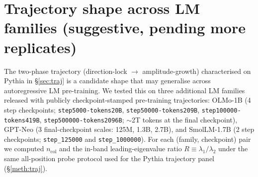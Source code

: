 \documentclass[11pt,a4paper]{article}
\begin{document}
\section{Trajectory shape across LM families (suggestive,
pending more replicates)}
\label{si:S15}

The two-phase trajectory (direction-lock $\to$ amplitude-growth)
characterised on Pythia in \S\ref{sec:traj} is a candidate
shape that may generalise across autoregressive LM pre-training.
We tested this on three additional LM families released with publicly
checkpoint-stamped pre-training trajectories: OLMo-1B (4 step
checkpoints; \texttt{step5000-tokens20B},
\texttt{step50000-tokens209B},
\texttt{step100000-tokens419B},
\texttt{step500000-tokens2096B}; $\sim$2T tokens at the final
checkpoint), GPT-Neo (3 final-checkpoint scales: 125M, 1.3B, 2.7B),
and SmolLM-1.7B (2 step checkpoints; \texttt{step\_125000} and
\texttt{step\_1000000}). For each (family, checkpoint) pair we
computed $n_\mathrm{col}$ and the in-band leading-eigenvalue
ratio $R\!\equiv\!\lambda_1/\lambda_2$ under the same all-position
probe protocol used for the Pythia trajectory panel
(\S\ref{meth:traj}).
\end{document}
